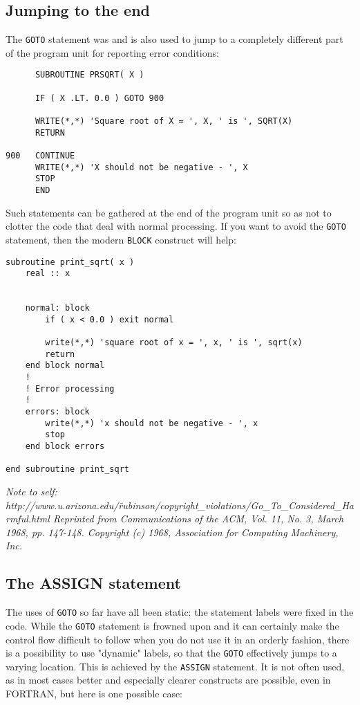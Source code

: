 \subsection{Jumping to the end}
The \verb+GOTO+ statement was and is also used to jump to a completely different
part of the program unit for reporting error conditions:
%
\begin{verbatim}
      SUBROUTINE PRSQRT( X )

      IF ( X .LT. 0.0 ) GOTO 900

      WRITE(*,*) 'Square root of X = ', X, ' is ', SQRT(X)
      RETURN

900   CONTINUE
      WRITE(*,*) 'X should not be negative - ', X
      STOP
      END
\end{verbatim}

Such statements can be gathered at the end of the program unit so as not to clotter
the code that deal with normal processing. If you want to avoid the \verb+GOTO+ statement,
then the modern \verb+BLOCK+ construct will help:
%
\begin{verbatim}
subroutine print_sqrt( x )
    real :: x


    normal: block
        if ( x < 0.0 ) exit normal

        write(*,*) 'square root of x = ', x, ' is ', sqrt(x)
        return
    end block normal
    !
    ! Error processing
    !
    errors: block
        write(*,*) 'x should not be negative - ', x
        stop
    end block errors

end subroutine print_sqrt
\end{verbatim}


\emph{Note to self: http://www.u.arizona.edu/\~rubinson/copyright\_violations/Go\_To\_Considered\_Harmful.html
Reprinted from Communications of the ACM, Vol. 11, No. 3, March 1968, pp. 147-148. Copyright (c) 1968, Association for Computing Machinery, Inc.
}


\subsection{The ASSIGN statement}
The uses of \verb+GOTO+ so far have all been static: the statement labels were fixed
in the code. While the \verb+GOTO+ statement is frowned upon and it can certainly make
the control flow difficult to follow when you do not use it in an orderly fashion, there
is a possibility to use "dynamic" labels, so that the \verb+GOTO+ effectively jumps to
a varying location. This is achieved by the \verb+ASSIGN+ statement. It is not often
used, as in most cases better and especially clearer constructs are possible, even
in FORTRAN, but here is one possible case:

